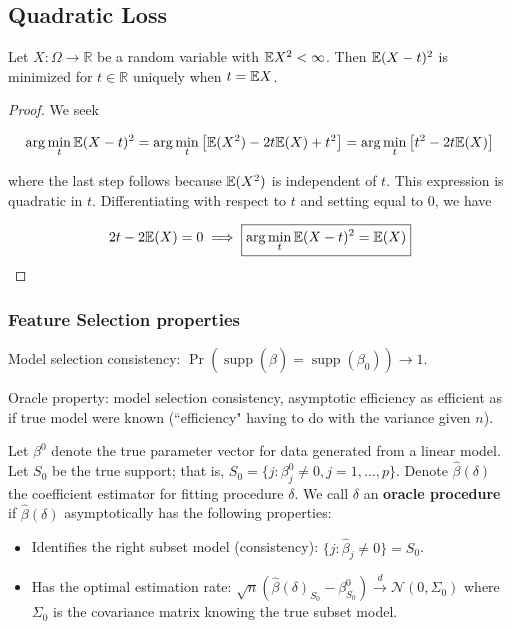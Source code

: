 \subsection{Quadratic Loss}

\begin{theorem}\label{exercise6.5}
Let $X:\Omega\to\mathbb{R}$ be a random variable with $\E X^{2}<\infty$. Then $\E(X-t)^{2}$ is minimized for $t\in\mathbb{R}$ uniquely when $t=\E X$.
\end{theorem}

\begin{proof}


We seek

\[
 \arg \min_t \E(X - t)^2 = \arg \min_t \big[ \E(X^2) - 2t\E(X) + t^2 \big] = \arg \min_t \big[  t^2 - 2t\E(X)\big] 
\]

where the last step follows because \(\E(X^2)\) is independent of \(t\). This expression is quadratic in \(t\). Differentiating with respect to \(t\) and setting equal to 0, we have

\[
2t - 2 \E(X) = 0 \implies \boxed{\arg \min_t \E(X - t)^2 = \E(X)}
\]

\end{proof}

\subsubsection{Feature Selection properties}

Model selection consistency: \(\Pr(\operatorname{supp}(\hat{\beta}) = \operatorname{supp}(\beta_0) ) \to 1\).

Oracle property: model selection consistency, asymptotic efficiency as efficient as if true model were known (``efficiency" having to do with the variance given \(n\)).

\begin{definition} Let \(\beta^0\) denote the true parameter vector for data generated from a linear model. Let \(S_0\) be the true support; that is, \(S_0 = \{j: \beta_j^0 \neq 0, j = 1, \ldots, p\}\). Denote \(\hat{\beta}(\delta)\) the coefficient estimator for fitting procedure \(\delta\). We call \(\delta\) an \textbf{oracle procedure} if \(\hat{\beta}(\delta)\) asymptotically has the following properties:

\begin{itemize}

\item Identifies the right subset model (consistency): \(\{j: \hat{\beta}_j \neq 0\} = S_0\).

\item Has the optimal estimation rate: \(\sqrt{n}(\hat{\beta}(\delta)_{S_0} - \beta_{S_0}^0) \xrightarrow{d} \mathcal{N}(0, \Sigma_0)\) where \(\Sigma_0\) is the covariance matrix knowing the true subset model.

\end{itemize}

\end{definition}

